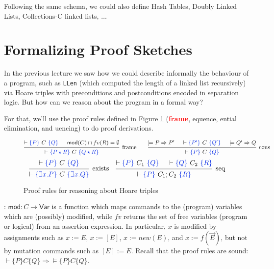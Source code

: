 \documentclass[11pt]{article}
\newcommand{\Mod}{\mathsf{mod}}
\newcommand{\Var}{\mathsf{Var}}
\begin{document}
Following the same schema, we could also define Hash Tables, Doubly Linked Lists, Collections-C linked lists, $\dots$

\section{Formalizing Proof Sketches}

In the previous lecture we saw how we could describe informally the behaviour of a program, such as \verb!LLen! (which computed the length of a linked list recursively) via Hoare triples with preconditions and postconditions encoded in separation logic. But how can we reason about the program in a formal way?

For that, we'll use the proof rules defined in Figure \ref{fig:proof_rules} (\textbf{\textcolor{red}{frame}}, equence, ential elimination, and uencing) to do proof derivations.

\begin{figure}[H]
\[
\begin{prooftree}
\hypo{\vdash \hoareT{P}{C}{Q}}
\hypo{\Mod(C) \cap fv(R) = \emptyset}
\infer2[frame]{\vdash \hoareT{P \star R}{C}{Q \star R}}
\end{prooftree}
\qquad 
\begin{prooftree}
\hypo{\models P \Rightarrow P'}
\hypo{\vdash \hoareT{P'}{C}{Q'}}
\hypo{\models Q' \Rightarrow Q}
\infer3[cons]{\vdash \hoareT{P}{C}{Q}}
\end{prooftree}
\]
\[
\begin{prooftree}
\hypo{\vdash \hoareT{P}{C}{Q}}
\infer1[exists]{\vdash \hoareT{\exists x. P}{C}{\exists x. Q}}
\end{prooftree}
\quad
\begin{prooftree}
\hypo{\vdash \hoareT{P}{C_1}{Q}}
\hypo{\vdash \hoareT{Q}{C_2}{R}}
\infer2[seq]{\vdash \hoareT{P}{C_1;C_2}{R}}
\end{prooftree}
\]
\label{fig:proof_rules}
\caption{Proof rules for reasoning about Hoare triples}
\end{figure}

: $\Mod : C \rightarrow \Var$ is a function which maps commands to the (program) variables which are (possibly) modified, while $fv$ returns the set of free variables (program or logical) from an assertion expression.
In particular, $x$ is modified by assignments such as $x := E$, $x := [E]$, $x := new(E)$, and $x := f(\vec{E})$, but not by mutation commands such as $[E] := E$.
Recall that the proof rules are sound: $\vdash \{P\}C\{Q\} \Rightarrow \models \{P\}C\{Q\}$.
\end{document}
